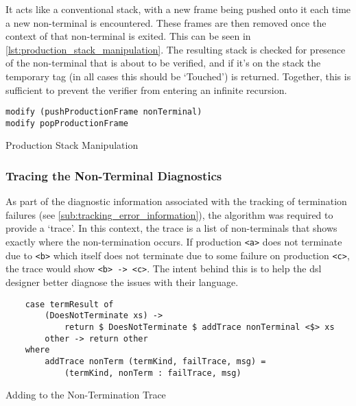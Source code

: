 It acts like a conventional stack, with a new frame being pushed onto it each time a new non-terminal is encountered.
These frames are then removed once the context of that non-terminal is exited.
This can be seen in \autoref{lst:production_stack_manipulation}.
The resulting stack is checked for presence of the non-terminal that is about to be verified, and if it's on the stack the temporary tag (in all cases this should be `Touched') is returned.
Together, this is sufficient to prevent the verifier from entering an infinite recursion.

\begin{listing}[!htb]
\begin{verbatim}
modify (pushProductionFrame nonTerminal)
modify popProductionFrame
\end{verbatim}
\caption{Production Stack Manipulation}
\label{lst:production_stack_manipulation}
\end{listing}


\subsubsection{Tracing the Non-Terminal Diagnostics} %
\label{ssub:tracing_the_non_terminal_diagnostics}
As part of the diagnostic information associated with the tracking of termination failures (see \autoref{sub:tracking_error_information}), the algorithm was required to provide a `trace'.
In this context, the trace is a list of non-terminals that shows exactly where the non-termination occurs.
If production \texttt{<a>} does not terminate due to \texttt{<b>} which itself does not terminate due to some failure on production \texttt{<c>}, the trace would show \texttt{<b> -> <c>}.
The intent behind this is to help the \gls{dsl} designer better diagnose the issues with their language.

\begin{listing}[!htb]
\begin{verbatim}
    case termResult of
        (DoesNotTerminate xs) ->
            return $ DoesNotTerminate $ addTrace nonTerminal <$> xs
        other -> return other
    where
        addTrace nonTerm (termKind, failTrace, msg) =
            (termKind, nonTerm : failTrace, msg)
\end{verbatim}
\caption{Adding to the Non-Termination Trace}
\label{lst:adding_to_the_non_termination_trace}
\end{listing}

